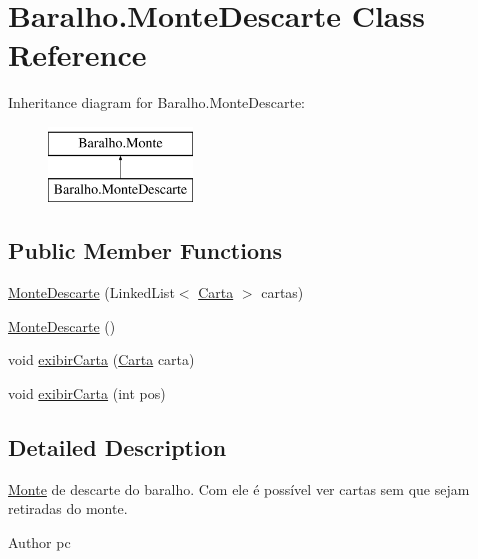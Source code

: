 \hypertarget{class_baralho_1_1_monte_descarte}{
\section{Baralho.MonteDescarte Class Reference}
\label{class_baralho_1_1_monte_descarte}
}
Inheritance diagram for Baralho.MonteDescarte:\begin{figure}[H]
\begin{center}
\leavevmode
\includegraphics[height=2.000000cm]{class_baralho_1_1_monte_descarte}
\end{center}
\end{figure}
\subsection*{Public Member Functions}
\begin{DoxyCompactItemize}
\item 
\hyperlink{class_baralho_1_1_monte_descarte_a6dad15a6fd2ff4a535663173892936c7}{MonteDescarte} (LinkedList$<$ \hyperlink{class_baralho_1_1_carta}{Carta} $>$ cartas)
\item 
\hyperlink{class_baralho_1_1_monte_descarte_aa36589f9e036fb890115e89e37b3b658}{MonteDescarte} ()
\item 
void \hyperlink{class_baralho_1_1_monte_descarte_a96b713dba347cd79bd944c0bef8a47ae}{exibirCarta} (\hyperlink{class_baralho_1_1_carta}{Carta} carta)
\item 
void \hyperlink{class_baralho_1_1_monte_descarte_a62c26b774387cec5611d723986c78ab0}{exibirCarta} (int pos)
\end{DoxyCompactItemize}


\subsection{Detailed Description}
\hyperlink{class_baralho_1_1_monte}{Monte} de descarte do baralho. Com ele é possível ver cartas sem que sejam retiradas do monte. \begin{DoxyAuthor}{Author}
pc 
\end{DoxyAuthor}


